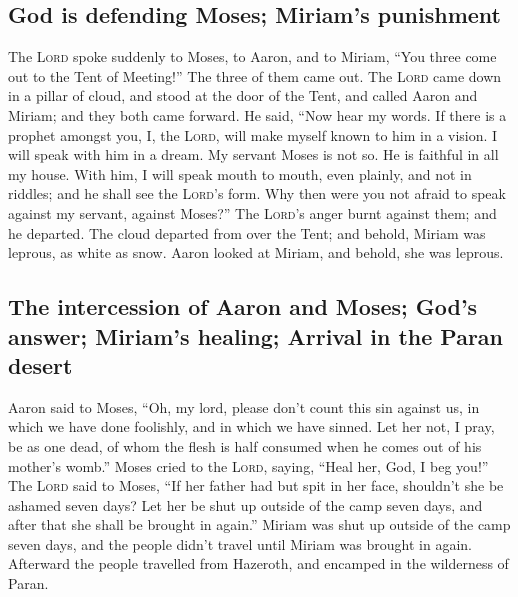 \hypertarget{god-is-defending-moses-miriams-punishment}{%
\subsection{God is defending Moses; Miriam's
punishment}\label{god-is-defending-moses-miriams-punishment}}

 The \textsc{Lord} spoke suddenly to Moses, to Aaron, and
to Miriam, ``You three come out to the Tent of Meeting!'' The three of
them came out.  The \textsc{Lord} came down in a pillar of
cloud, and stood at the door of the Tent, and called Aaron and Miriam;
and they both came forward.  He said, ``Now hear my words.
If there is a prophet amongst you, I, the \textsc{Lord}, will make
myself known to him in a vision. I will speak with him in a dream.
 My servant Moses is not so. He is faithful in all my
house.  With him, I will speak mouth to mouth, even
plainly, and not in riddles; and he shall see the \textsc{Lord}'s form.
Why then were you not afraid to speak against my servant, against
Moses?''  The \textsc{Lord}'s anger burnt against them;
and he departed.  The cloud departed from over the Tent;
and behold, Miriam was leprous, as white as snow. Aaron looked at
Miriam, and behold, she was leprous.

\hypertarget{the-intercession-of-aaron-and-moses-gods-answer-miriams-healing-arrival-in-the-paran-desert}{%
\subsection{The intercession of Aaron and Moses; God's answer; Miriam's
healing; Arrival in the Paran
desert}\label{the-intercession-of-aaron-and-moses-gods-answer-miriams-healing-arrival-in-the-paran-desert}}

 Aaron said to Moses, ``Oh, my lord, please don't count
this sin against us, in which we have done foolishly, and in which we
have sinned.  Let her not, I pray, be as one dead, of
whom the flesh is half consumed when he comes out of his mother's
womb.''  Moses cried to the \textsc{Lord}, saying, ``Heal
her, God, I beg you!''  The \textsc{Lord} said to Moses,
``If her father had but spit in her face, shouldn't she be ashamed seven
days? Let her be shut up outside of the camp seven days, and after that
she shall be brought in again.''  Miriam was shut up
outside of the camp seven days, and the people didn't travel until
Miriam was brought in again.  Afterward the people
travelled from Hazeroth, and encamped in the wilderness of Paran.

